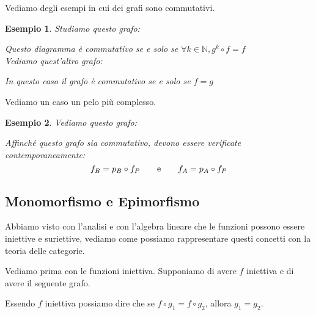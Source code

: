\documentclass[11pt,a4paper,twoside]{article}
\newtheorem{es}{Esempio}
\theoremstyle{definition}
\begin{document}
Vediamo degli esempi in cui dei grafi sono commutativi.

\begin{es}
	Studiamo questo grafo:
	\begin{center}
	\end{center}
	Questo diagramma è commutativo se e solo se $\forall k \in \mathbb N, g^k \circ f = f$\\
	Vediamo quest'altro grafo:
	\begin{center}
	\end{center}
	In questo caso il grafo è commutativo se e solo se $f = g$
\end{es}

Vediamo un caso un pelo più complesso.

\begin{es}
	Vediamo questo grafo:
	\begin{center}
	\end{center}
	Affinché questo grafo sia commutativo, devono essere verificate contemporaneamente:
	\[ f_B = p_B \circ f_P \qquad \text e \qquad f_A = p_A \circ f_P \]
\end{es}

\subsection{Monomorfismo e Epimorfismo}

Abbiamo visto con l'analisi e con l'algebra lineare che le funzioni possono essere iniettive e suriettive, vediamo come possiamo rappresentare questi concetti con la teoria delle categorie.

Vediamo prima con le funzioni iniettiva. Supponiamo di avere $f$ iniettiva e di avere il seguente grafo.
\begin{center}
\end{center}
Essendo $f$ iniettiva possiamo dire che se $f \circ g_1 = f \circ g_2$, allora $g_1 = g_2$.
\end{document}
